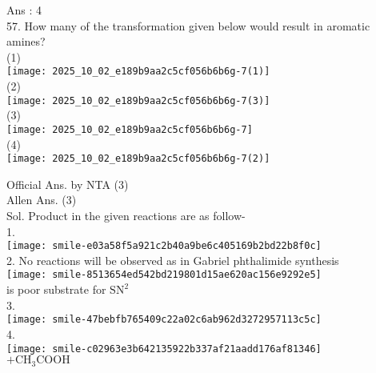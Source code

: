 \documentclass[10pt]{article}
\begin{document}
Ans : 4\\
57. How many of the transformation given below would result in aromatic amines?\\
(1)\\
\texttt{[image: 2025\_10\_02\_e189b9aa2c5cf056b6b6g-7(1)]}\\
(2)\\
\texttt{[image: 2025\_10\_02\_e189b9aa2c5cf056b6b6g-7(3)]}\\
(3)\\
\texttt{[image: 2025\_10\_02\_e189b9aa2c5cf056b6b6g-7]}\\
(4)\\
\texttt{[image: 2025\_10\_02\_e189b9aa2c5cf056b6b6g-7(2)]}

Official Ans. by NTA (3)\\
Allen Ans. (3)\\
Sol. Product in the given reactions are as follow-\\
1.\\
\texttt{[image: smile-e03a58f5a921c2b40a9be6c405169b2bd22b8f0c]}\\
2. No reactions will be observed as in Gabriel phthalimide synthesis\\
\texttt{[image: smile-8513654ed542bd219801d15ae620ac156e9292e5]}\\
is poor substrate for \(\mathrm{SN}^{2}\)\\
3.\\
\texttt{[image: smile-47bebfb765409c22a02c6ab962d3272957113c5c]}\\
4.\\
\texttt{[image: smile-c02963e3b642135922b337af21aadd176af81346]}\\
\(+\mathrm{CH}_{3} \mathrm{COOH}\)
\end{document}
